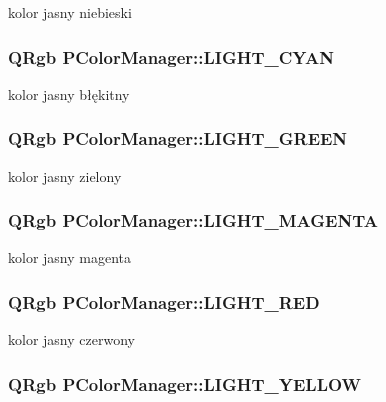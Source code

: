 kolor jasny niebieski \hypertarget{classPColorManager_4b0005532d50c98afdbde28fb3081e47}{
\subsubsection[{LIGHT\_\-CYAN}]{\setlength{\rightskip}{0pt plus 5cm}QRgb {\bf PColorManager::LIGHT\_\-CYAN}}}
\label{classPColorManager_4b0005532d50c98afdbde28fb3081e47}


kolor jasny błękitny \hypertarget{classPColorManager_45eba1a3facb6995710a2d1e9026ca7c}{
\subsubsection[{LIGHT\_\-GREEN}]{\setlength{\rightskip}{0pt plus 5cm}QRgb {\bf PColorManager::LIGHT\_\-GREEN}}}
\label{classPColorManager_45eba1a3facb6995710a2d1e9026ca7c}


kolor jasny zielony \hypertarget{classPColorManager_435503e14622c3bf22d82a4c5ac12884}{
\subsubsection[{LIGHT\_\-MAGENTA}]{\setlength{\rightskip}{0pt plus 5cm}QRgb {\bf PColorManager::LIGHT\_\-MAGENTA}}}
\label{classPColorManager_435503e14622c3bf22d82a4c5ac12884}


kolor jasny magenta \hypertarget{classPColorManager_cbc4c8b260f0ba856d8454ae2f9320d5}{
\subsubsection[{LIGHT\_\-RED}]{\setlength{\rightskip}{0pt plus 5cm}QRgb {\bf PColorManager::LIGHT\_\-RED}}}
\label{classPColorManager_cbc4c8b260f0ba856d8454ae2f9320d5}


kolor jasny czerwony \hypertarget{classPColorManager_945305800d979369bb29d9f3ec5fe7f3}{
\subsubsection[{LIGHT\_\-YELLOW}]{\setlength{\rightskip}{0pt plus 5cm}QRgb {\bf PColorManager::LIGHT\_\-YELLOW}}}
\label{classPColorManager_945305800d979369bb29d9f3ec5fe7f3}


